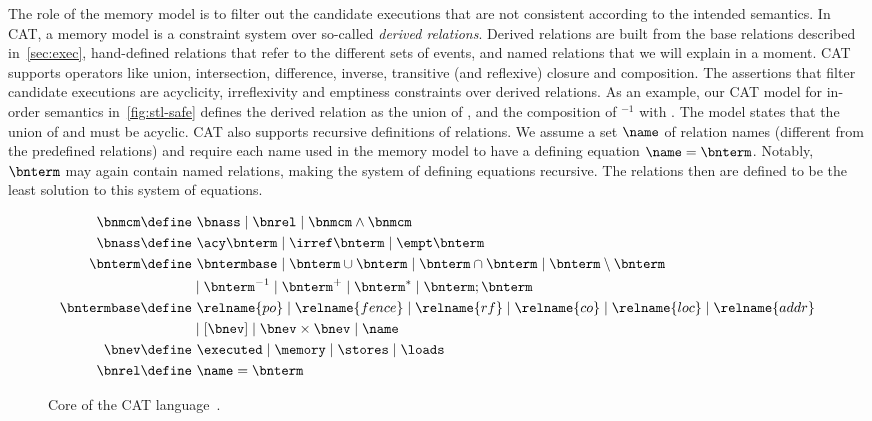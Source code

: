 \documentclass[conference]{IEEEtran}
\begin{document}
The role of the memory model is to filter out the candidate executions that are not consistent according to the intended semantics.
In CAT, a memory model is a constraint system over so-called \emph{derived relations}. 
Derived relations are built from the base relations described in~\autoref{sec:exec}, hand-defined relations that refer to the different sets of events, and named relations that we will explain in a moment.
CAT supports operators like union, intersection, difference, inverse, transitive (and reflexive) closure and composition.
The assertions that filter candidate executions are acyclicity, irreflexivity and emptiness constraints over derived relations.
As an example, our CAT model for in-order semantics in~\autoref{fig:stl-safe} defines the derived relation  as the union of ,  and the composition of $^{-1}$ with .
The model states that the union of  and  must be acyclic.
CAT also supports recursive definitions of relations.
We assume a set $\name$ of relation names (different from the predefined relations) and require each name used in the memory model to have a defining equation $\name=\bnterm$. 
Notably, $\bnterm$ may again contain named relations, making the system of defining equations recursive.
The relations then are defined to be the least solution to this system of equations.

\begin{figure}[t]\small
		\begin{align*}
		\bnmcm  \define &\  \bnass\mid \bnrel \mid \bnmcm \wedge \bnmcm\\
		\bnass  \define &\ \acy \bnterm  \mid \irref \bnterm \mid \empt \bnterm  \\
		\bnterm \define&\  \bntermbase \mid \bnterm \cup \bnterm \mid \bnterm \cap \bnterm \mid \bnterm \setminus \bnterm \\
		& \mid \bnterm^{-1}  \mid \bnterm^+ \mid \bnterm^* \mid \bnterm;\bnterm  \\
		\bntermbase \define &\ \relname{po}  \mid \relname{fence} \mid \relname{rf} \mid \relname{co} \mid \relname{loc} \mid \relname{addr} \\
		& \mid [\bnev] \mid \bnev \times \bnev\mid \name  \\
		\bnev  \define &\ \executed \mid \memory \mid \stores \mid \loads\\
		\bnrel  \define &\ \name = \bnterm
		\end{align*}
		\caption{Core of the CAT language~\cite{cat}.}
		\label{fig:model}
\end{figure}
\end{document}
